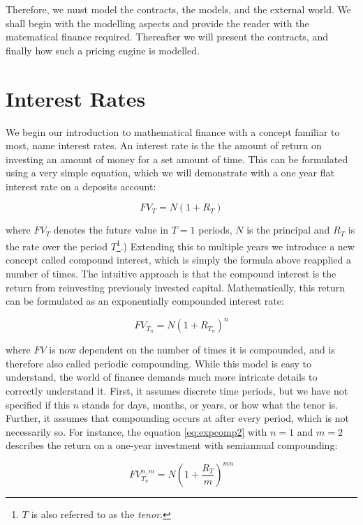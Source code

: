 Therefore, we must model the contracts, the models, and the external world.
We shall begin with the modelling aspects and provide the reader with the
matematical finance required. Thereafter we will present the contracts, and
finally how such a pricing engine is modelled. 

\section{Interest Rates}

We begin our introduction to mathematical finance with a concept familiar to
most, name interest rates. An interest rate is the the amount of return on
investing an amount of money for a set amount of time. This can be formulated
using a very simple equation, which we will demonstrate with a one year flat
interest rate on a deposits account:

\begin{equation}\label{eq:lincomp}
FV_T = N (1 + R_T)
\end{equation}

where $FV_T$ denotes the future value in $T=1$ periods, $N$ is the principal
and $R_T$ is the rate over the period $T$\footnote{$T$ is also referred to as the
\emph{tenor}.}.) Extending this to multiple years we introduce a new 
concept called compound interest, which is simply the formula above reapplied
a number of times. The intuitive approach is
that the compound interest is the return from reinvesting previously invested
capital. Mathematically, this return can be formulated as an exponentially 
compounded interest rate:

\begin{equation}\label{eq:expcomp}
FV_{T_n} = N (1 + R_{T_n})^n
\end{equation}

where $FV$ is now dependent on the number of times it is compounded, and is 
therefore also called periodic compounding.
While this model is easy to understand, the world of finance demands much more 
intricate details to correctly understand it. First, it assumes 
discrete time periods, but we have not specified if this $n$ stands for days, 
months, or years, or how what the tenor is. Further, it assumes that compounding
occurs at after every period, which is not necessarily so. For instance, the
equation \ref{eq:expcomp2} with $n=1$ and $m=2$ describes the return on a one-year
investment with semiannual compounding:

\begin{equation}\label{eq:expcomp2}
FV_{T_n}^{n,m} = N (1 + \frac{R_T}{m})^{mn}
\end{equation}

